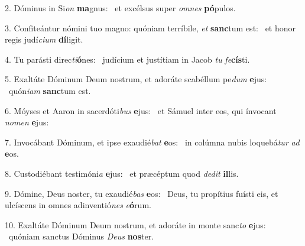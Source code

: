 2. Dóminus in Si\textit{on} \textbf{ma}gnus: \ast\  et excélsus super \textit{om}\textit{nes} \textbf{pó}pulos.\

3. Confiteántur nómini tuo magno: quóniam terríbile, \textit{et} \textbf{sanc}tum est: \ast\  et honor regis judí\textit{ci}\textit{um} \textbf{dí}ligit.\

4. Tu parásti direc\textit{ti}\textbf{ó}nes: \ast\  judícium et justítiam in Jacob \textit{tu} \textit{fe}\textbf{cís}ti.\

5. Exaltáte Dóminum Deum nostrum, et adoráte scabéllum pe\textit{dum} \textbf{e}jus: \ast\  quón\textit{i}\textit{am} \textbf{sanc}tum est.\

6. Móyses et Aaron in sacerdóti\textit{bus} \textbf{e}jus: \ast\  et Sámuel inter eos, qui ínvocant \textit{no}\textit{men} \textbf{e}jus:\

7. Invocábant Dóminum, et ipse exaudié\textit{bat} \textbf{e}os: \ast\  in colúmna nubis loquebá\textit{tur} \textit{ad} \textbf{e}os.\

8. Custodiébant testimóni\textit{a} \textbf{e}jus: \ast\  et præcéptum quod \textit{de}\textit{dit} \textbf{il}lis.\

9. Dómine, Deus noster, tu exaudié\textit{bas} \textbf{e}os: \ast\  Deus, tu propítius fuísti eis, et ulcíscens in omnes adinventió\textit{nes} \textit{e}\textbf{ó}rum.\

10. Exaltáte Dóminum Deum nostrum, et adoráte in monte sanc\textit{to} \textbf{e}jus: \ast\  quóniam sanctus Dóminus \textit{De}\textit{us} \textbf{nos}ter.\

